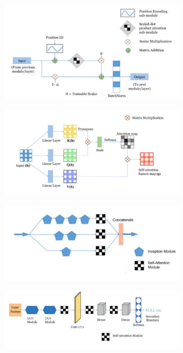 \documentclass[11 pt, a4paper]{article}
\begin{document}
\begin{figure}
    \centering
    \begin{subfigure}{0.4\textwidth}
    \includegraphics[width=\textwidth]{1a.jpg}
    \caption{}
    \label{fig:first}
\end{subfigure}
\hfill
\begin{subfigure}{0.4\textwidth}
    \includegraphics[width=\textwidth]{1b.jpg}
    \caption{}
    \label{fig:second}
\end{subfigure}
\hfill
\begin{subfigure}{0.4\textwidth}
    \includegraphics[width=\textwidth]{1c.jpg}
    \caption{}
    \label{fig:third}
\end{subfigure}
\hfill
\begin{subfigure}{0.4\textwidth}
    \includegraphics[width=\textwidth]{1d.jpg}
    \caption{}
    \label{fig:fourth}
\end{subfigure}
        

\end{figure}
\end{document}

